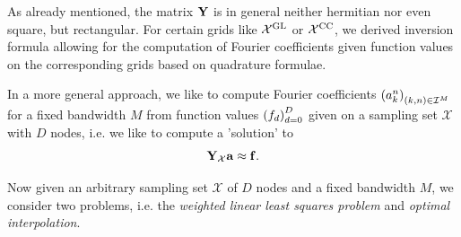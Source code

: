 As already mentioned, the matrix $\mathbf{Y}$ is in general neither hermitian nor 
even square, but rectangular. For certain grids like $\mathcal{X^{\mbox{\scriptsize\rm{GL}}}}$ or 
$\mathcal{X^{\mbox{\scriptsize\rm{CC}}}}$, we derived inversion formula allowing for the computation 
of Fourier coefficients given function values on the corresponding grids 
based on quadrature formulae. 

In a more general approach, we like to compute Fourier coefficients 
$\left(a_{k}^n\right)_{(k,n) \in \mathcal{I}^M}$ for a fixed bandwidth $M$
from function values $\left(f_{d}\right)_{d=0}^D$ given on a sampling set
$\mathcal{X}$ with $D$ nodes, i.e. we like to compute a 'solution' to
\begin{equation}
  \label{Applications:Problem}
  \mathbf{Y}_{\mathcal{X}} \mathbf{a} \approx \mathbf{f}.
\end{equation}

Now given an arbitrary sampling set $\mathcal{X}$ of $D$ nodes and a fixed 
bandwidth $M$, we consider two problems, i.e. the \emph{weighted linear 
least squares problem} and \emph{optimal interpolation}.

